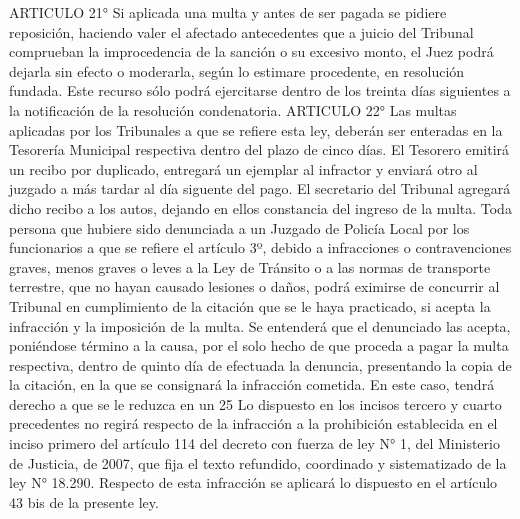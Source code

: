     ARTICULO 21° Si aplicada una multa y antes de ser pagada se pidiere reposición, haciendo valer el afectado antecedentes que a juicio del Tribunal comprueban la improcedencia de la sanción o su excesivo monto, el Juez podrá dejarla sin efecto o moderarla, según lo estimare procedente, en resolución fundada.
    Este recurso sólo podrá ejercitarse dentro de los treinta días siguientes a la notificación de la resolución condenatoria.
    ARTICULO 22° Las multas aplicadas por los Tribunales a que se refiere esta ley, deberán ser enteradas en la Tesorería Municipal respectiva dentro del plazo de cinco días.
    El Tesorero emitirá un recibo por duplicado, entregará un ejemplar al infractor y enviará otro al juzgado a más tardar al día siguente del pago. El secretario del Tribunal agregará dicho recibo a los autos, dejando en ellos constancia del ingreso de la multa.
    Toda persona que hubiere sido denunciada a un Juzgado de Policía Local por los funcionarios a que se refiere el artículo 3º, debido a infracciones o contravenciones graves, menos graves o leves a la Ley de Tránsito o a las normas de transporte terrestre, que no hayan causado lesiones o daños, podrá eximirse de concurrir al Tribunal en cumplimiento de la citación que se le haya practicado, si acepta la infracción y la imposición de la multa.
    Se entenderá que el denunciado las acepta, poniéndose término a la causa, por el solo hecho de que proceda a pagar la multa respectiva, dentro de quinto día de efectuada la denuncia, presentando la copia de la citación, en la que se consignará la infracción cometida. En este caso, tendrá derecho a que se le reduzca en un 25%
    Lo dispuesto en los incisos tercero y cuarto precedentes no regirá respecto de la infracción a la prohibición establecida en el inciso primero del artículo 114 del decreto con fuerza de ley N° 1, del Ministerio de Justicia, de 2007, que fija el texto refundido, coordinado y sistematizado de la ley N° 18.290. Respecto de esta infracción se aplicará lo dispuesto en el artículo 43 bis de la presente ley.   

